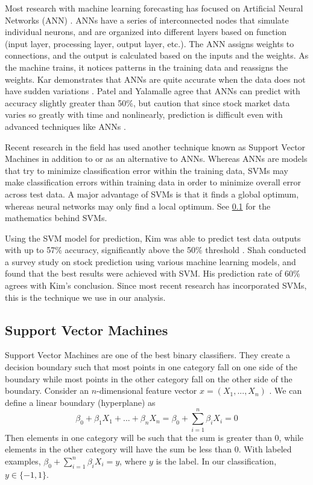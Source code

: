 \documentclass[pageno]{jpaper}
\begin{document}
Most research with machine learning forecasting has focused on Artificial Neural Networks (ANN) \cite{krollner}. ANNs have a series of interconnected nodes that simulate individual neurons, and are organized into different layers based on function (input layer, processing layer, output layer, etc.). The ANN assigns weights to connections, and the output is calculated based on the inputs and the weights. As the machine trains, it notices patterns in the training data and reassigns the weights. Kar demonstrates that ANNs are quite accurate when the data does not have sudden variations \cite{kar}. Patel and Yalamalle agree that ANNs can predict with accuracy slightly greater than 50\%, but caution that since stock market data varies so greatly with time and nonlinearly, prediction is difficult even with advanced techniques like ANNs \cite{patel}.

Recent research in the field has used another technique known as Support Vector Machines in addition to or as an alternative to ANNs. Whereas ANNs are models that try to minimize classification error within the training data, SVMs may make classification errors within training data in order to minimize overall error across test data. A major advantage of SVMs is that it finds a global optimum, whereas neural networks may only find a local optimum. See \ref{subsec: svm} for the mathematics behind SVMs.

Using the SVM model for prediction, Kim was able to predict test data outputs with up to 57\% accuracy, significantly above the 50\% threshold \cite{kim}. Shah conducted a survey study on stock prediction using various machine learning models, and found that the best results were achieved with SVM\cite{shah}. His prediction rate of 60\% agrees with Kim's conclusion. Since most recent research has incorporated SVMs, this is the technique we use in our analysis.

\subsection{Support Vector Machines}
\label{subsec: svm}

Support Vector Machines are one of the best binary classifiers. They create a decision boundary such that most points in one category fall on one side of the boundary while most points in the other category fall on the other side of the boundary. Consider an $n$-dimensional feature vector $x = (X_1, ..., X_n)$ \cite{halls-moore}. We can define a linear boundary (hyperplane) as 
$$\beta_0+\beta_1X_1+...+\beta_nX_n=\beta_0+\sum_{i=1}^n\beta_iX_i = 0$$
Then elements in one category will be such that the sum is greater than 0, while elements in the other category will have the sum be less than 0. With labeled examples, $\beta_0+\sum_{i=1}^n\beta_iX_i = y$, where $y$ is the label. In our classification, $y \in \{-1, 1\}$.
\end{document}
